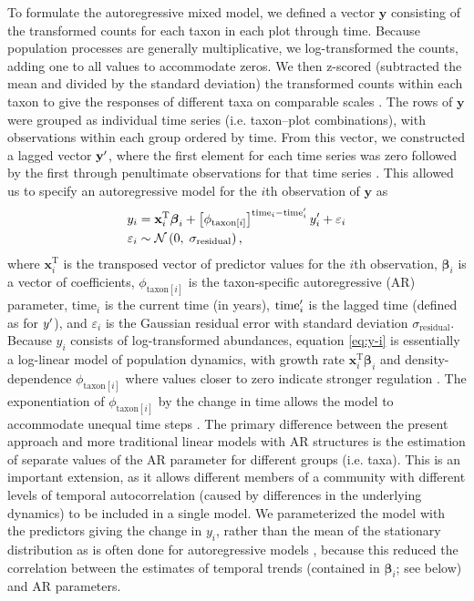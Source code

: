 To formulate the autoregressive mixed model, we defined a vector $\mathbf{y}$
consisting of the transformed counts for each taxon in each plot through time.
Because population processes are generally multiplicative, we log-transformed the counts,
adding one to all values to accommodate zeros.
We then z-scored (subtracted the mean and divided by the standard deviation) the
transformed counts within each taxon to give the responses of different taxa on
comparable scales \citep{Jackson2012}.
The rows of $\mathbf{y}$ were grouped as individual time series
(i.e. taxon--plot combinations), with observations within each group ordered by time.
From this vector, we constructed a lagged vector $\mathbf{y\sp{\prime}}$,
where the first element for each time series was zero followed by the first through
penultimate observations for that time series \citep{Ives2006}.
This allowed us to specify an autoregressive model for the $i$th observation of
$\mathbf{y}$ as
%
\begin{equation} \label{eq:y-i}
\begin{split}
    y_i &= \mathbf{x}_i^\text{T} {\boldsymbol\beta}_i +
        \left[ \phi_{\text{taxon}[i]} \right]^{\text{time}_i - \text{time}\sp{\prime}_i}
        y\sp{\prime}_i + \varepsilon_i \\
    \varepsilon_i &\sim \mathcal{N} \left(0, \; \sigma_{\text{residual}} \right)
    \text{,}
\end{split}
\end{equation}
%
\noindent where $\mathbf{x}_i^\text{T}$ is the transposed vector
of predictor values for the $i$th observation,
${\boldsymbol\beta}_i$ is a vector of coefficients,
$\phi_{\text{taxon}[i]}$ is the taxon-specific autoregressive (AR) parameter,
$\text{time}_i$ is the current time (in years),
$\text{time}\sp{\prime}_i$ is the lagged time (defined as for  $y\sp{\prime}$),
and $\varepsilon_i$  is the Gaussian residual
error with standard deviation $\sigma_{\text{residual}}$.
Because $y_i$ consists of log-transformed abundances, equation \ref{eq:y-i} is
essentially a log-linear model of population dynamics, with growth rate
$\mathbf{x}_i^\text{T} {\boldsymbol\beta}_i$ and
density-dependence $\phi_{\text{taxon}[i]}$
where values closer to zero indicate stronger regulation \citep{Ives2010, Ziebarth2010}.
The exponentiation of $\phi_{\text{taxon}[i]}$ by the change in time allows the model
to accommodate unequal time steps \citep{Zuur2009}.
The primary difference between the present approach and more traditional linear models
with AR structures \citep[e.g.][]{Zuur2009} is the estimation of separate values of the AR
parameter for different groups (i.e. taxa).
This is an important extension, as it allows different members of a community with
different levels of temporal autocorrelation (caused by differences in the underlying
dynamics) to be included in a single model.
We parameterized the model with the predictors giving the change in $y_i$,
rather than the mean of the stationary distribution as is often done
for autoregressive models \citep{Harvey1990, Ives2006},
because this reduced the correlation between the estimates of temporal trends
(contained in ${\boldsymbol\beta}_i$; see below) and AR parameters.


